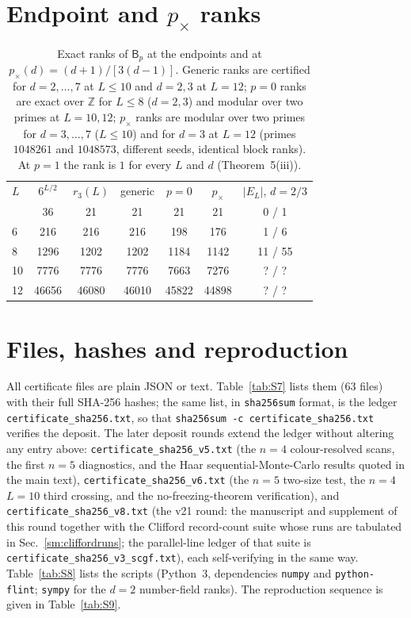 \documentclass[aps,prx,reprint,superscriptaddress,nobibnotes,longbibliography]{revtex4-2}
\begin{document}
\section{Endpoint and $p_\times$ ranks}
\label{sm:endpoints}

\begin{table}[h]
\caption{Exact ranks of $\mathsf B_p$ at the endpoints and at $p_\times(d)=(d+1)/[3(d-1)]$.  Generic ranks are certified for $d=2,\ldots,7$ at $L\le10$ and $d=2,3$ at $L=12$; $p=0$ ranks are exact over $\mathbb Z$ for $L\le8$ ($d=2,3$) and modular over two primes at $L=10,12$; $p_\times$ ranks are modular over two primes for $d=3,\ldots,7$ ($L\le10$) and for $d=3$ at $L=12$ (primes $1048261$ and $1048573$, different seeds, identical block ranks).  At $p=1$ the rank is $1$ for every $L$ and $d$ (Theorem~5(iii)).}
\label{tab:S6}
\small
\begin{ruledtabular}
\begin{tabular}{lcccccc}
$L$ & $6^{L/2}$ & $r_3(L)$ & generic & $p=0$ & $p_\times$ & $|E_L|$, $d=2/3$\\
\colrule
4 & 36 & 21 & 21 & 21 & 21 & 0 / 1\\
6 & 216 & 216 & 216 & 198 & 176 & 1 / 6\\
8 & 1296 & 1202 & 1202 & 1184 & 1142 & 11 / 55\\
10 & 7776 & 7776 & 7776 & 7663 & 7276 & ? / ?\\
12 & 46656 & 46080 & 46010 & 45822 & 44898 & ? / ?\\
\end{tabular}
\end{ruledtabular}
\end{table}

\section{Files, hashes and reproduction}
\label{sm:files}

All certificate files are plain JSON or text.  Table~\ref{tab:S7} lists them ($63$ files) with their full SHA-256 hashes; the same list, in \texttt{sha256sum} format, is the ledger \texttt{certificate\_sha256.txt}, so that \texttt{sha256sum -c certificate\_sha256.txt} verifies the deposit.  The later deposit rounds extend the ledger without altering any entry above: \texttt{certificate\_sha256\_v5.txt} (the $n=4$ colour-resolved scans, the first $n=5$ diagnostics, and the Haar sequential-Monte-Carlo results quoted in the main text), \texttt{certificate\_sha256\_v6.txt} (the $n=5$ two-size test, the $n=4$ $L=10$ third crossing, and the no-freezing-theorem verification), and \texttt{certificate\_sha256\_v8.txt} (the v21 round: the manuscript and supplement of this round together with the Clifford record-count suite whose runs are tabulated in Sec.~\ref{sm:cliffordruns}; the parallel-line ledger of that suite is \texttt{certificate\_sha256\_v3\_scgf.txt}), each self-verifying in the same way.  Table~\ref{tab:S8} lists the scripts (Python~3, dependencies \texttt{numpy} and \texttt{python-flint}; \texttt{sympy} for the $d=2$ number-field ranks).  The reproduction sequence is given in Table~\ref{tab:S9}.
\end{document}
